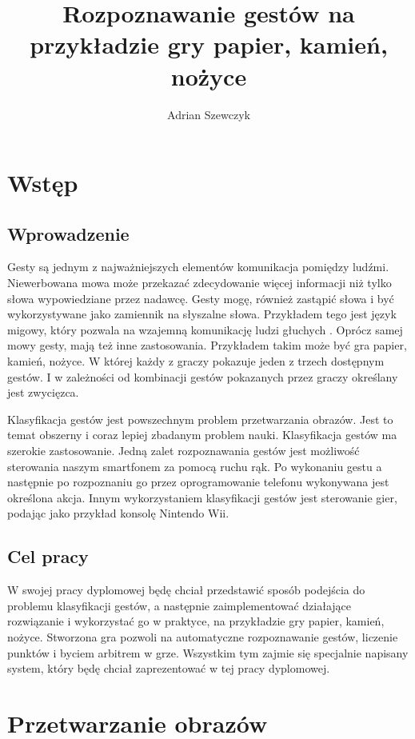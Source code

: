 \documentclass[a4paper,12pt,twoside,openany]{report}
\title{Rozpoznawanie gestów na przykładzie gry papier, kamień, nożyce}
\author{Adrian Szewczyk}
\begin{document}
\maketitle


\chapter{Wstęp}
\section{Wprowadzenie}
Gesty są jednym z najważniejszych elementów komunikacja pomiędzy ludźmi. Niewerbowana mowa może przekazać zdecydowanie więcej informacji niż tylko słowa wypowiedziane przez nadawcę. Gesty mogę, również zastąpić słowa i być wykorzystywane jako zamiennik na słyszalne słowa. Przykładem tego jest język migowy, który pozwala na wzajemną komunikację ludzi głuchych . Oprócz samej mowy gesty, mają też inne zastosowania. Przykładem takim może być gra papier, kamień, nożyce. W której każdy z graczy pokazuje jeden z trzech dostępnym gestów. I w zależności od kombinacji gestów pokazanych przez graczy określany jest zwycięzca.

Klasyfikacja gestów jest powszechnym problem przetwarzania obrazów. Jest to temat obszerny i coraz lepiej zbadanym problem nauki. Klasyfikacja gestów ma szerokie zastosowanie. Jedną zalet rozpoznawania gestów jest możliwość sterowania naszym smartfonem za pomocą ruchu rąk. Po wykonaniu gestu a następnie po rozpoznaniu go przez  oprogramowanie telefonu wykonywana jest określona akcja. Innym wykorzystaniem klasyfikacji gestów jest sterowanie gier, podając jako przykład konsolę Nintendo Wii.

\section{Cel pracy}
W swojej pracy dyplomowej będę chciał przedstawić sposób podejścia do problemu klasyfikacji gestów, a następnie zaimplementować działające rozwiązanie i wykorzystać go w praktyce, na przykładzie gry papier, kamień, nożyce. Stworzona gra pozwoli na automatyczne rozpoznawanie gestów, liczenie punktów i byciem arbitrem w grze. Wszystkim tym zajmie się specjalnie napisany system, który będę chciał zaprezentować w tej pracy dyplomowej.

\chapter{Przetwarzanie obrazów}
\end{document}
